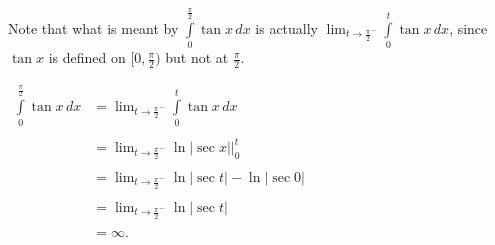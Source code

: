 \documentclass[12pt]{article}
\begin{document}
Note that what is meant by $\displaystyle \int\limits_0^{\frac{\pi}{2}} \tan x \, dx$ is actually $\displaystyle \lim_{t \to \frac{\pi}{2}^-} \int\limits_0^t \tan x \, dx$, since $\tan x$ is defined on $[0, \frac{\pi}{2})$ but not at $\frac{\pi}{2}$.

\begin{center}
$\begin{array}{ll}
\displaystyle \int\limits_0^{\frac{\pi}{2}} \tan x \, dx & \displaystyle = \lim_{t \to \frac{\pi}{2}^-} \int\limits_0^t \tan x \, dx \\
& \\
& \displaystyle  = \lim_{t \to \frac{\pi}{2}^-} \ln |\sec x| \bigg|_0^t \\
& \\
& \displaystyle = \lim_{t \to \frac{\pi}{2}^-} \ln |\sec t| - \ln |\sec 0| \\
& \\
& \displaystyle = \lim_{t \to \frac{\pi}{2}^-} \ln |\sec t| \\
& \\
& \displaystyle = \infty. \end{array}$ \end{center}

\end{document}
